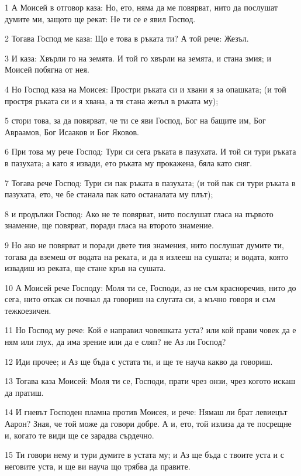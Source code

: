 \par 1 А Моисей в отговор каза: Но, ето, няма да ме повярват, нито да послушат думите ми, защото ще рекат: Не ти се е явил Господ.
\par 2 Тогава Господ ме каза: Що е това в ръката ти? А той рече: Жезъл.
\par 3 И каза: Хвърли го на земята. И той го хвърли на земята, и стана змия; и Моисей побягна от нея.
\par 4 Но Господ каза на Моисея: Простри ръката си и хвани я за опашката; (и той простря ръката си и я хвана, а тя стана жезъл в ръката му);
\par 5 стори това, за да повярват, че ти се яви Господ, Бог на бащите им, Бог Авраамов, Бог Исааков и Бог Яковов.
\par 6 При това му рече Господ: Тури си сега ръката в пазухата. И той си тури ръката в пазухата; а като я извади, ето ръката му прокажена, бяла като сняг.
\par 7 Тогава рече Господ: Тури си пак ръката в пазухата; (и той пак си тури ръката в пазухата, ето, че бе станала пак като останалата му плът);
\par 8 и продължи Господ: Ако не те повярват, нито послушат гласа на първото знамение, ще повярват, поради гласа на второто знамение.
\par 9 Но ако не повярват и поради двете тия знамения, нито послушат думите ти, тогава да вземеш от водата на реката, и да я излееш на сушата; и водата, която извадиш из реката, ще стане кръв на сушата.
\par 10 А Моисей рече Господу: Моля ти се, Господи, аз не съм красноречив, нито до сега, нито откак си почнал да говориш на слугата си, а мъчно говоря и съм тежкоезичен.
\par 11 Но Господ му рече: Кой е направил човешката уста? или кой прави човек да е ням или глух, да има зрение или да е сляп? не Аз ли Господ?
\par 12 Иди прочее; и Аз ще бъда с устата ти, и ще те науча какво да говориш.
\par 13 Тогава каза Моисей: Моля ти се, Господи, прати чрез онзи, чрез когото искаш да пратиш.
\par 14 И гневът Господен пламна против Моисея, и рече: Нямаш ли брат левиецът Аарон? Зная, че той може да говори добре. А и, ето, той излиза да те посрещне и, когато те види ще се зарадва сърдечно.
\par 15 Ти говори нему и тури думите в устата му; и Аз ще бъда с твоите уста и с неговите уста, и ще ви науча що трябва да правите.
